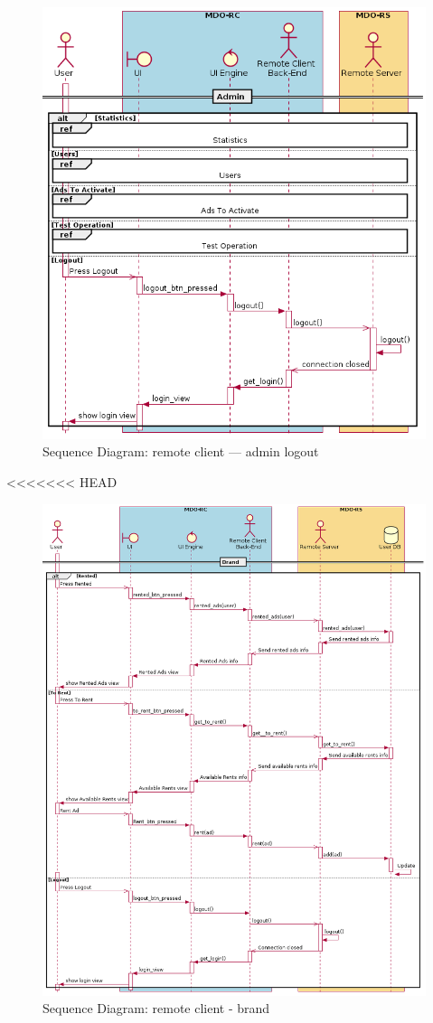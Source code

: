 \begin{figure}[htb!]
\centering
    \includegraphics[width=0.7\columnwidth]{./img/seq-rc-admin-logout.png}
  \caption{Sequence Diagram: remote client --- admin logout}%
\label{fig:seq-rc-admin-logout}
\end{figure}

<<<<<<< HEAD
\begin{figure}[htb!]
\centering
    \includegraphics[width=0.9\columnwidth]{./img/seq-rc-brand.png}
  \caption{Sequence Diagram: remote client - brand}%
\label{fig:seq-rc-brand}
\end{figure}

